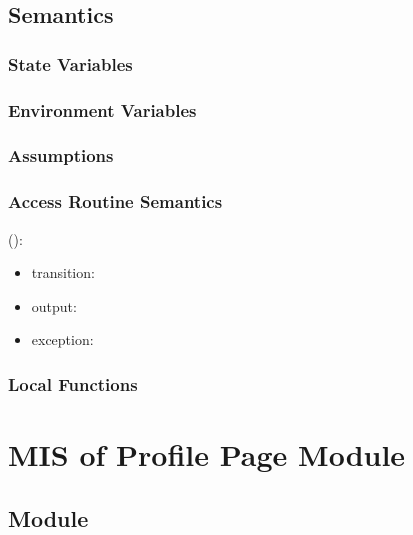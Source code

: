 \documentclass[12pt, titlepage]{article}
\begin{document}
\subsection{Semantics}

\subsubsection{State Variables}



\subsubsection{Environment Variables}



\subsubsection{Assumptions}



\subsubsection{Access Routine Semantics}

\noindent {}():
\begin{itemize}
\item transition:  
\item output:  
\item exception:  
\end{itemize}



\subsubsection{Local Functions}


\newpage






\section{MIS of Profile Page Module}



\subsection{Module}
\end{document}
